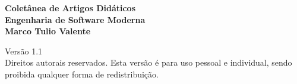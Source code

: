 \thispagestyle{empty}

\newpage
\thispagestyle{empty}
\vspace*{4.5cm}
\begin{center}
{\Huge \bf Coletânea de Artigos Didáticos}\\ 
\vspace*{0.6cm}
{\Huge \bf Engenharia de Software Moderna}\\ 
\vspace*{3cm}
{\Large \bf Marco Tulio Valente}
\end{center}
\newpage

\thispagestyle{empty}
\vspace*{3cm}
\begin{center}
{\Large  Versão 1.1}\\ 
\vspace*{1cm}
{Direitos autorais reservados. Esta versão é para uso pessoal e individual, sendo proibida qualquer forma de redistribuição.}
\end{center}
\newpage

\tableofcontents

